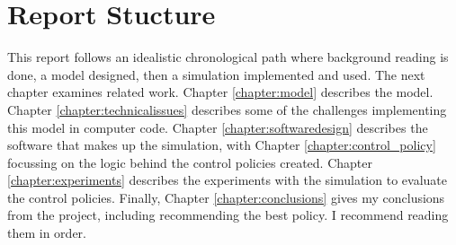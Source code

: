   \section{Report Stucture}
  This report follows an idealistic chronological path where background reading is done, a model designed, then a simulation implemented and used. The next chapter examines related work. Chapter \ref{chapter:model} describes the model. Chapter \ref{chapter:technicalissues} describes some of the challenges implementing this model in computer code. Chapter \ref{chapter:softwaredesign} describes the software that makes up the simulation, with Chapter \ref{chapter:control_policy} focussing on the logic behind the control policies created. Chapter \ref{chapter:experiments} describes the experiments with the simulation to evaluate the control policies. Finally, Chapter \ref{chapter:conclusions} gives my conclusions from the project, including recommending the best policy. I recommend reading them in order.
